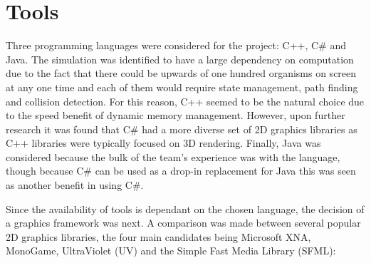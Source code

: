\documentclass[a4paper, oneside, 11pt]{report}
\begin{document}
\section{Tools}\label{tools}
Three programming languages were considered for the project: C++, C\# and Java. The simulation was identified to have a large dependency on computation due to the fact that there could be upwards of one hundred organisms on screen at any one time and each of them would require state management, path finding and collision detection. For this reason, C++ seemed to be the natural choice due to the speed benefit of dynamic memory management. However, upon further research it was found that C\# had a more diverse set of 2D graphics libraries as C++ libraries were typically focused on 3D rendering. Finally, Java was considered because the bulk of the team's experience was with the language, though because C\# can be used as a drop-in replacement for Java this was seen as another benefit in using C\#.

Since the availability of tools is dependant on the chosen language, the decision of a graphics framework was next. A comparison was made between several popular 2D graphics libraries, the four main candidates being Microsoft XNA, MonoGame, UltraViolet (UV) and the Simple Fast Media Library (SFML):
\end{document}
